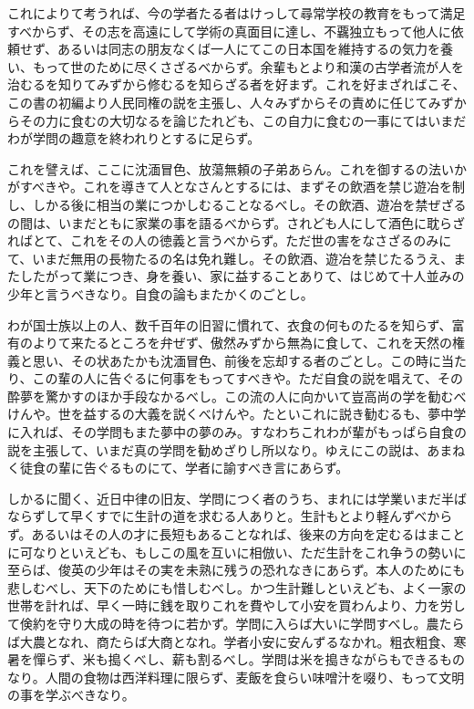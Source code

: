 \documentclass[a4paper, platex, dvipdfmx]{jsarticle}
\begin{document}
これによりて考うれば、今の学者たる者はけっして尋常学校の教育をもって満足すべからず、その志を高遠にして学術の真面目に達し、不覊独立もって他人に依頼せず、あるいは同志の朋友なくば一人にてこの日本国を維持するの気力を養い、もって世のために尽くさざるべからず。余輩もとより和漢の古学者流が人を治むるを知りてみずから修むるを知らざる者を好まず。これを好まざればこそ、この書の初編より人民同権の説を主張し、人々みずからその責めに任じてみずからその力に食むの大切なるを論じたれども、この自力に食むの一事にてはいまだわが学問の趣意を終われりとするに足らず。

これを譬えば、ここに沈湎冒色、放蕩無頼の子弟あらん。これを御するの法いかがすべきや。これを導きて人となさんとするには、まずその飲酒を禁じ遊冶を制し、しかる後に相当の業につかしむることなるべし。その飲酒、遊冶を禁ぜざるの間は、いまだともに家業の事を語るべからず。されども人にして酒色に耽らざればとて、これをその人の徳義と言うべからず。ただ世の害をなさざるのみにて、いまだ無用の長物たるの名は免れ難し。その飲酒、遊冶を禁じたるうえ、またしたがって業につき、身を養い、家に益することありて、はじめて十人並みの少年と言うべきなり。自食の論もまたかくのごとし。

わが国士族以上の人、数千百年の旧習に慣れて、衣食の何ものたるを知らず、富有のよりて来たるところを弁ぜず、傲然みずから無為に食して、これを天然の権義と思い、その状あたかも沈湎冒色、前後を忘却する者のごとし。この時に当たり、この輩の人に告ぐるに何事をもってすべきや。ただ自食の説を唱えて、その酔夢を驚かすのほか手段なかるべし。この流の人に向かいて豈高尚の学を勧むべけんや。世を益するの大義を説くべけんや。たといこれに説き勧むるも、夢中学に入れば、その学問もまた夢中の夢のみ。すなわちこれわが輩がもっぱら自食の説を主張して、いまだ真の学問を勧めざりし所以なり。ゆえにこの説は、あまねく徒食の輩に告ぐるものにて、学者に諭すべき言にあらず。

しかるに聞く、近日中律の旧友、学問につく者のうち、まれには学業いまだ半ばならずして早くすでに生計の道を求むる人ありと。生計もとより軽んずべからず。あるいはその人の才に長短もあることなれば、後来の方向を定むるはまことに可なりといえども、もしこの風を互いに相倣い、ただ生計をこれ争うの勢いに至らば、俊英の少年はその実を未熟に残うの恐れなきにあらず。本人のためにも悲しむべし、天下のためにも惜しむべし。かつ生計難しといえども、よく一家の世帯を計れば、早く一時に銭を取りこれを費やして小安を買わんより、力を労して倹約を守り大成の時を待つに若かず。学問に入らば大いに学問すべし。農たらば大農となれ、商たらば大商となれ。学者小安に安んずるなかれ。粗衣粗食、寒暑を憚らず、米も搗くべし、薪も割るべし。学問は米を搗きながらもできるものなり。人間の食物は西洋料理に限らず、麦飯を食らい味噌汁を啜り、もって文明の事を学ぶべきなり。
\end{document}
